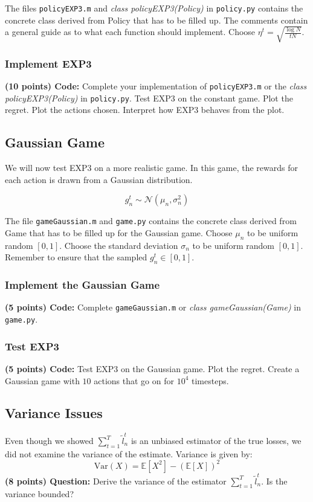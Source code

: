 \documentclass{article}
\newcommand{\tl}{\tilde{l}}
\begin{document}
The files \texttt{policyEXP3.m} and \textit{class policyEXP3(Policy)} in \texttt{policy.py} contains the concrete class derived from Policy that has to be filled up. The comments contain a general guide as to what each function should implement. Choose $\eta^t = \sqrt{\frac{\log N}{tN}}$. 

\subsubsection{Implement EXP3} \label{q:exp3constant}
\textbf{(10 points) Code:} Complete your implementation of \texttt{policyEXP3.m} or the \textit{class policyEXP3(Policy)} in \texttt{policy.py}. Test EXP3 on the constant game. Plot the regret. Plot the actions chosen. Interpret how EXP3 behaves from the plot.

\subsection{Gaussian Game}

We will now test EXP3 on a more realistic game. In this game, the rewards for each action is drawn from a Gaussian distribution. 

\begin{equation}
g^t_n \sim \mathcal{N}(\mu_n, \sigma^2_n )
\end{equation}

The file \texttt{gameGaussian.m} and \texttt{game.py} contains the concrete class derived from Game that has to be filled up for the Gaussian game. 
Choose $\mu_n$ to be uniform random $[0,1]$. Choose the standard deviation $\sigma_n$ to be uniform random $[0,1]$. Remember to ensure that the sampled $g^t_n \in [0,1]$.

\subsubsection{Implement the Gaussian Game}
\textbf{ (5 points) Code:} Complete \texttt{gameGaussian.m} or \textit{class gameGaussian(Game)} in \texttt{game.py}.

\subsubsection{Test EXP3}
\textbf{ (5 points) Code:} Test EXP3 on the Gaussian game. Plot the regret. Create a Gaussian game with $10$ actions that go on for $10^4$ timesteps.

\subsection{Variance Issues}
Even though we showed $\sum\limits_{t=1}^T \tl^t_n$ is an unbiased estimator of the true losses, we did not examine the variance of the estimate. Variance is given by:$$\mathrm{Var}(X) = \mathbb{E}[X^2] - (\mathbb{E}[X])^2$$
\noindent\textbf{(8 points) Question:} Derive the variance of the estimator $\sum\limits_{t=1}^T \tl^t_n$. Is the variance bounded?
\end{document}
